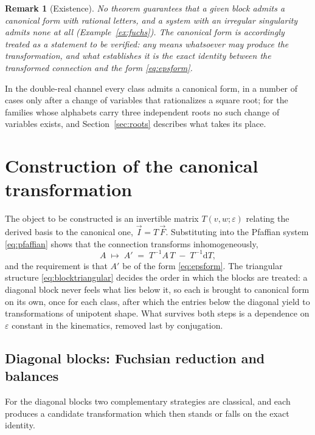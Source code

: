 \documentclass[11pt]{article}
\newcommand{\eps}{\varepsilon}
\newcommand{\dd}{\mathrm{d}}
\newtheorem{remark}[definition]{Remark}
\begin{document}
\begin{remark}[Existence]
No theorem guarantees that a given block admits a canonical form with
rational letters, and a system with an irregular singularity admits
none at all (Example~\ref{ex:fuchs}).  The canonical form is
accordingly treated as a \emph{statement to be verified}: any means
whatsoever may produce the transformation, and what establishes it is
the exact identity between the transformed connection and the form
\eqref{eq:epsform}.
\end{remark}

In the double-real channel every class admits a canonical form, in a
number of cases only after a change of variables that rationalizes a
square root; for the families whose alphabets carry three independent
roots no such change of variables exists, and
Section~\ref{sec:roots} describes what takes its place.

\section{Construction of the canonical transformation}
\label{sec:finding}

The object to be constructed is an invertible matrix $T(v,w;\eps)$
relating the derived basis to the canonical one,
$\vec I = T\,\vec F$.  Substituting into the Pfaffian system
\eqref{eq:pfaffian} shows that the connection transforms
inhomogeneously,
\begin{equation}
  A \;\longmapsto\; A' \;=\; T^{-1} A\, T \;-\; T^{-1}\dd T ,
  \label{eq:gauge}
\end{equation}
and the requirement is that $A'$ be of the form \eqref{eq:epsform}.
The triangular structure \eqref{eq:blocktriangular} decides the order
in which the blocks are treated: a diagonal block never feels what
lies below it, so each is brought to canonical form on its own, once
for each class, after which the entries below the diagonal yield to
transformations of unipotent shape.  What survives both steps is a
dependence on $\eps$ constant in the kinematics, removed last by
conjugation.

\subsection{Diagonal blocks: Fuchsian reduction and balances}
\label{sec:diagonal}

For the diagonal blocks two complementary strategies are classical,
and each produces a candidate transformation which then stands or
falls on the exact identity.
\end{document}
